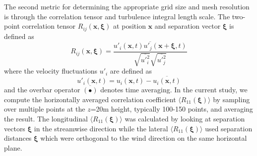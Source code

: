 The second metric for determining the appropriate grid size and mesh
resolution is through the correlation tensor and turbulence integral
length scale.  The two-point correlation tensor
$R_{ij}(\mathbf{x},\boldsymbol{\xi})$ at position $\mathbf{x}$ and
separation vector $\boldsymbol{\xi}$ is defined as
\begin{equation}
  \label{eq:Rij}
  R_{ij}({\mathbf x},\boldsymbol{\xi}) = 
  \frac{\overline{ {u'_i(\mathbf{x}, t) u'_j(\mathbf{x}+\boldsymbol{\xi},t)} }}
       { \sqrt{\overline{ u'^2_i }} \sqrt{\overline{ u'^2_j}} }
\end{equation}
where the velocity fluctuations $u'_i$ are defined as 
\begin{equation}
  u'_i(\mathbf{x},t) = u_i(\mathbf{x},t) - \overline{ u_i(\mathbf{x},t) }
\end{equation}
and the overbar operator $\overline{(\bullet)}$ denotes time
averaging.  In the current study, we compute the horizontally averaged
correlation coefficient $\langle R_{11}(\boldsymbol{\xi})\rangle$ by
sampling over multiple points at the $z$=20m height, typically 100-150
points, and averaging the result.  The longitudinal $\langle
R_{11}(\boldsymbol{\xi})\rangle$ was calculated by looking at
separation vectors $\boldsymbol{\xi}$ in the streamwise direction
while the lateral $\langle R_{11}(\boldsymbol{\xi})\rangle$ used
separation distances $\boldsymbol{\xi}$ which were orthogonal to the
wind direction on the same horizontal plane.

